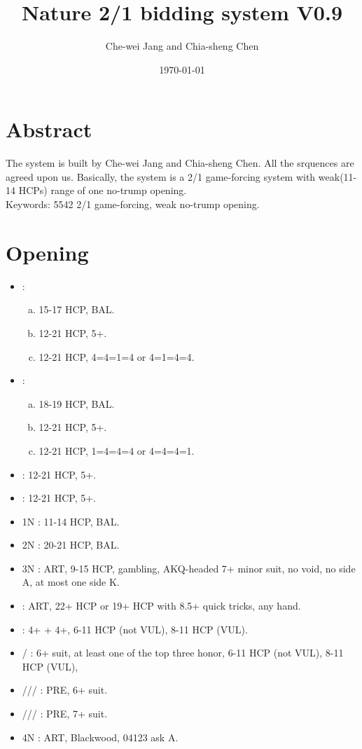 \documentclass[12pt,twoside,a5paper]{report}%
\begin{document}
\title{Nature 2/1 bidding system V0.9}
\author{Che-wei Jang and Chia-sheng Chen}
\date{\today}
\maketitle
\tableofcontents


\chapter*{Abstract}
	The system is built by Che-wei Jang and Chia-sheng Chen. All the srquences are agreed upon us. Basically, the system is a 2/1 game-forcing system with weak(11-14 HCPs) range of one no-trump opening.\\

	Keywords: 5542 2/1 game-forcing, weak no-trump opening.
\chapter*{Opening}
	\begin{itemize}
	\renewcommand{\labelitemi}{}
		\item {} : 
		\begin{enumerate}[(a)]
			\item 15-17 HCP, BAL.
			\item 12-21 HCP, 5+\cl{}.
			\item 12-21 HCP, 4=4=1=4 or 4=1=4=4.
		\end{enumerate}
		\item {} :
		\begin{enumerate}[(a)]
			\item 18-19 HCP, BAL.
			\item 12-21 HCP, 5+\di{}.
			\item 12-21 HCP, 1=4=4=4 or 4=4=4=1.
		\end{enumerate}
		\item {} : 12-21 HCP, 5+\he{}.
		\item {} : 12-21 HCP, 5+\sp{}.
		\item 1N : 11-14 HCP, BAL.
		\item 2N : 20-21 HCP, BAL.
		\item 3N : ART, 9-15 HCP, gambling, AKQ-headed 7+ minor suit, no void, no side A, at most one side K.
		\item {} : ART, 22+ HCP or 19+ HCP with 8.5+ quick tricks, any hand.
		\item {} : 4+\sp{} + 4+\he{}, 6-11 HCP (not VUL), 8-11 HCP (VUL).
		\item {}/\sp{} : 6+ suit, at least one of the top three honor, 6-11 HCP (not VUL), 8-11 HCP (VUL), 
		\item {}/\di{}/\he{}/\sp{} : PRE, 6+ suit.
		\item {}/\di{}/\he{}/\sp{} : PRE, 7+ suit.
		\item 4N : ART, Blackwood, 04123 ask A.
	\end{itemize}
\end{document}
